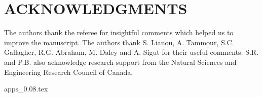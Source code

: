 \documentclass[useAMS,usenatbib]{mn2e}
\begin{document}
\section*{ACKNOWLEDGMENTS}
The authors thank the referee for insightful comments which helped us to improve the manuscript.
The authors thank S. Lianou, A. Tammour, S.C. Gallagher, R.G. Abraham, M. Daley and A. Sigut for their useful comments. 
S.R. and P.B. also acknowledge research support from the Natural Sciences and Engineering Research Council of Canada. 



{apps_0.08.tex}
\end{document}
